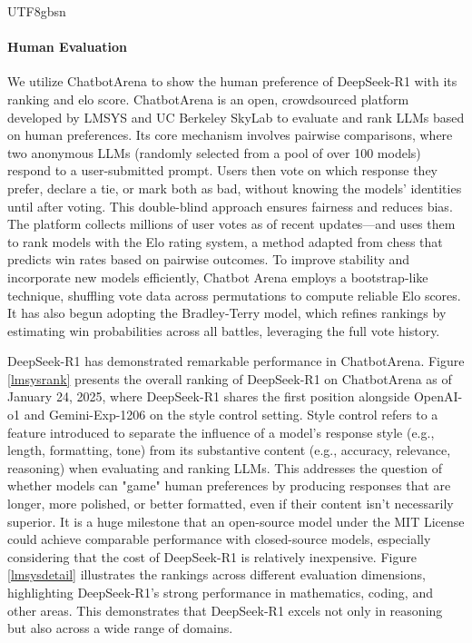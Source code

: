 \documentclass[11pt, a4paper, logo, copyright, nonumbering]{deepseek}
\newcommand{\dsri}{DeepSeek-R1}
\begin{document}
\begin{CJK*}{UTF8}{gbsn}
\paragraph{Human Evaluation}  We utilize ChatbotArena  \citep{chiang2024chatbot} to show the human preference of \dsri{} with its ranking and elo score.  ChatbotArena is an open, crowdsourced platform developed by LMSYS and UC Berkeley SkyLab to evaluate and rank LLMs based on human preferences. Its core mechanism involves pairwise comparisons, where two anonymous LLMs (randomly selected from a pool of over 100 models) respond to a user-submitted prompt. Users then vote on which response they prefer, declare a tie, or mark both as bad, without knowing the models' identities until after voting. This double-blind approach ensures fairness and reduces bias.
The platform collects millions of user votes as of recent updates—and uses them to rank models with the Elo rating system, a method adapted from chess that predicts win rates based on pairwise outcomes. To improve stability and incorporate new models efficiently, Chatbot Arena employs a bootstrap-like technique, shuffling vote data across permutations to compute reliable Elo scores. It has also begun adopting the Bradley-Terry model, which refines rankings by estimating win probabilities across all battles, leveraging the full vote history.

DeepSeek-R1 has demonstrated remarkable performance in ChatbotArena. Figure \ref{lmsysrank} presents the overall ranking of \dsri{} on ChatbotArena as of January 24, 2025, where \dsri{} shares the first position alongside OpenAI-o1 and Gemini-Exp-1206 on the style control setting. Style control refers to a feature introduced to separate the influence of a model's response style (e.g., length, formatting, tone) from its substantive content (e.g., accuracy, relevance, reasoning) when evaluating and ranking LLMs. This addresses the question of whether models can "game" human preferences by producing responses that are longer, more polished, or better formatted, even if their content isn’t necessarily superior. It is a huge milestone that an open-source model under the MIT License could achieve comparable performance with closed-source models, especially considering that the cost of \dsri{} is relatively inexpensive. Figure \ref{lmsysdetail} illustrates the rankings across different evaluation dimensions, highlighting \dsri{}'s strong performance in mathematics, coding, and other areas. This demonstrates that \dsri{} excels not only in reasoning but also across a wide range of domains.


\end{CJK*}
\end{document}
